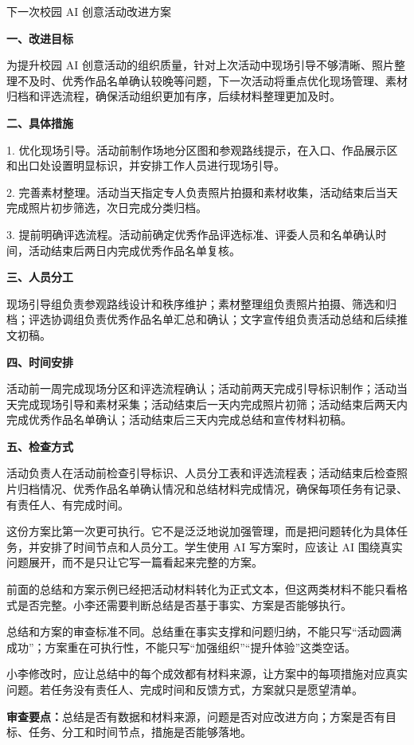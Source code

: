 \begin{aibox}
下一次校园 AI 创意活动改进方案

\textbf{一、改进目标}

为提升校园 AI 创意活动的组织质量，针对上次活动中现场引导不够清晰、照片整理不及时、优秀作品名单确认较晚等问题，下一次活动将重点优化现场管理、素材归档和评选流程，确保活动组织更加有序，后续材料整理更加及时。

\textbf{二、具体措施}

1. 优化现场引导。活动前制作场地分区图和参观路线提示，在入口、作品展示区和出口处设置明显标识，并安排工作人员进行现场引导。

2. 完善素材整理。活动当天指定专人负责照片拍摄和素材收集，活动结束后当天完成照片初步筛选，次日完成分类归档。

3. 提前明确评选流程。活动前确定优秀作品评选标准、评委人员和名单确认时间，活动结束后两日内完成优秀作品名单复核。

\textbf{三、人员分工}

现场引导组负责参观路线设计和秩序维护；素材整理组负责照片拍摄、筛选和归档；评选协调组负责优秀作品名单汇总和确认；文字宣传组负责活动总结和后续推文初稿。

\textbf{四、时间安排}

活动前一周完成现场分区和评选流程确认；活动前两天完成引导标识制作；活动当天完成现场引导和素材采集；活动结束后一天内完成照片初筛；活动结束后两天内完成优秀作品名单确认；活动结束后三天内完成总结和宣传材料初稿。

\textbf{五、检查方式}

活动负责人在活动前检查引导标识、人员分工表和评选流程表；活动结束后检查照片归档情况、优秀作品名单确认情况和总结材料完成情况，确保每项任务有记录、有责任人、有完成时间。
\end{aibox}

这份方案比第一次更可执行。它不是泛泛地说加强管理，而是把问题转化为具体任务，并安排了时间节点和人员分工。学生使用 AI 写方案时，应该让 AI 围绕真实问题展开，而不是只让它写一篇看起来完整的方案。

前面的总结和方案示例已经把活动材料转化为正式文本，但这两类材料不能只看格式是否完整。小李还需要判断总结是否基于事实、方案是否能够执行。

\begin{critiquebox}
总结和方案的审查标准不同。总结重在事实支撑和问题归纳，不能只写“活动圆满成功”；方案重在可执行性，不能只写“加强组织”“提升体验”这类空话。

小李修改时，应让总结中的每个成效都有材料来源，让方案中的每项措施对应真实问题。若任务没有责任人、完成时间和反馈方式，方案就只是愿望清单。

\textbf{审查要点：}总结是否有数据和材料来源，问题是否对应改进方向；方案是否有目标、任务、分工和时间节点，措施是否能够落地。
\end{critiquebox}


